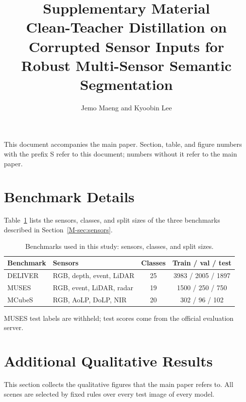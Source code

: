 \documentclass[10pt]{article}
\title{Supplementary Material\\[4pt]\large Clean-Teacher Distillation on Corrupted Sensor Inputs for Robust Multi-Sensor Semantic Segmentation}
\author{Jemo Maeng and Kyoobin Lee}
\date{}
\newcommand{\tabsetup}{\footnotesize\setlength{\tabcolsep}{2.5pt}\renewcommand{\arraystretch}{1.1}}
\newcommand{\tabnote}[1]{\par\vspace{3pt}\parbox{\columnwidth}{\raggedright\scriptsize #1}}
\begin{document}
\maketitle

This document accompanies the main paper. Section, table, and figure numbers with the prefix S refer to this document; numbers without it refer to the main paper.

\section{Benchmark Details}
\label{app:bench}
Table~\ref{tab:benchmarks} lists the sensors, classes, and split sizes of the three benchmarks described in Section~\ref{M-sec:sensors}.

\begin{table}[!htbp]
\caption{Benchmarks used in this study: sensors, classes, and split sizes.}
\label{tab:benchmarks}
\centering\tabsetup
\begin{tabular*}{\columnwidth}{@{\extracolsep{\fill}}llcc@{}}
\toprule
Benchmark & Sensors & Classes & Train / val / test \\
\midrule
DELIVER~\cite{cmnext2023} & RGB, depth, event, LiDAR & 25 & 3983 / 2005 / 1897 \\
MUSES~\cite{muses2024} & RGB, event, LiDAR, radar & 19 & 1500 / 250 / 750 \\
MCubeS~\cite{mcubes2022} & RGB, AoLP, DoLP, NIR & 20 & 302 / 96 / 102 \\
\bottomrule
\end{tabular*}
\tabnote{MUSES test labels are withheld; test scores come from the official evaluation server.}
\end{table}

\section{Additional Qualitative Results}
\label{app:qual}
This section collects the qualitative figures that the main paper refers to. All scenes are selected by fixed rules over every test image of every model.
\end{document}
